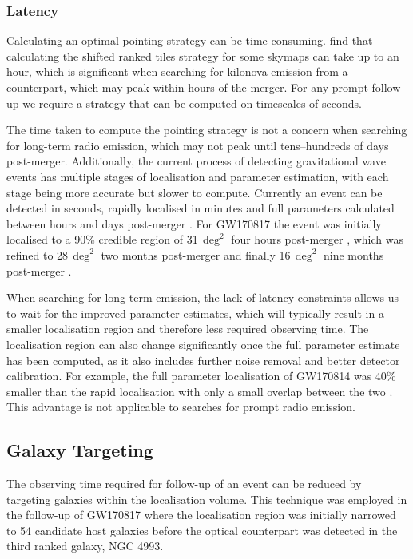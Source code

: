 \subsubsection{Latency}
Calculating an optimal pointing strategy can be time consuming. \citet{2017PASP..129k4503G} find that calculating the shifted ranked tiles strategy for some skymaps can take up to an hour, which is significant when searching for kilonova emission from a counterpart, which may peak within hours of the merger. For any prompt follow-up we require a strategy that can be computed on timescales of seconds.

The time taken to compute the pointing strategy is not a concern when searching for long-term radio emission, which may not peak until tens--hundreds of days post-merger. Additionally, the current process of detecting gravitational wave events has multiple stages of localisation and parameter estimation, with each stage being more accurate but slower to compute. Currently an event can be detected in seconds, rapidly localised in minutes and full parameters calculated between hours and days post-merger \citep{2014ApJ...795..105S}. For GW170817 the event was initially localised to a 90\% credible region of 31\,$\deg^{2}$ four hours post-merger \citep{GCN21513}, which was refined to 28\,$\deg^{2}$ two months post-merger \citep{GCN21983} and finally 16\,$\deg^{2}$ nine months post-merger \citep{2019PhRvX...9a1001A}.

When searching for long-term emission, the lack of latency constraints allows us to wait for the improved parameter estimates, which will typically result in a smaller localisation region and therefore less required observing time. The localisation region can also change significantly once the full parameter estimate has been computed, as it also includes further noise removal and better detector calibration. For example, the full parameter localisation of GW170814 was 40\% smaller than the rapid localisation with only a small overlap between the two \citep[Fig. 3 of][]{2017PhRvL.119n1101A}. This advantage is not applicable to searches for prompt radio emission.




\subsection{Galaxy Targeting}
\label{sec:galaxy_targeting}
The observing time required for follow-up of an event can be reduced by targeting galaxies within the localisation volume. This technique was employed in the follow-up of GW170817 where the localisation region was initially narrowed to 54 candidate host galaxies \citep[e.g.][]{GCN21519} before the optical counterpart was detected in the third ranked galaxy, NGC 4993.

